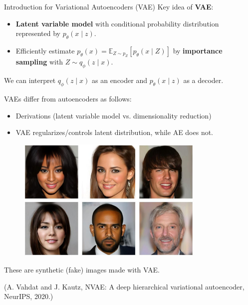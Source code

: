 \begin{frame}[allowframebreaks]

\begin{myconceptblock}{11.3}{Introduction for Variational Autoencoders (VAE)}
    Key idea of \textbf{VAE}:

    \begin{itemize}
        \item \textbf{Latent variable model} with conditional probability distribution represented by $p_{\theta}(x \mid z)$.
        \item Efficiently estimate $p_{\theta}(x)=\mathbb{E}_{Z \sim p_{Z}}\left[p_{\theta}(x \mid Z)\right]$ by \textbf{importance sampling} with $Z \sim q_{\phi}(z \mid x)$.
    \end{itemize}

    We can interpret $q_{\phi}(z \mid x)$ as an encoder and $p_{\theta}(x \mid z)$ as a decoder.

    VAEs differ from autoencoders as follows:

    \begin{itemize}
        \item Derivations (latent variable model vs. dimensionality reduction)
        \item VAE regularizes/controls latent distribution, while AE does not.
    \end{itemize}
\end{myconceptblock}

\end{frame}


\begin{frame}[allowframebreaks]

\begin{figure}[H]
    \centering
    \includegraphics[width=0.8\textwidth]{.././assets/11.1.png}
\end{figure}

These are synthetic (fake) images made with VAE.

(A. Vahdat and J. Kautz, NVAE: A deep hierarchical variational autoencoder, NeurIPS, 2020.)

\end{frame}

